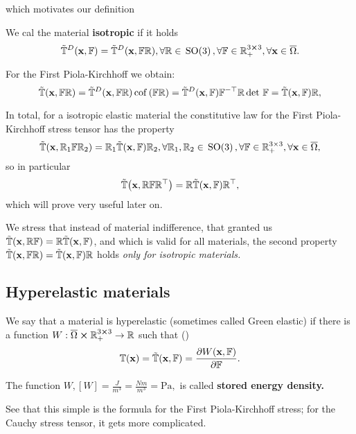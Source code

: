 \documentclass[11pt]{scrartcl} %
\begin{document}
which motivates our definition

\begin{definition}
	We cal the material \textbf{isotropic} if it holds
	\[
		\tilde{\mathbb{T}}^D\qty(\vb{x},\mathbb{F}) = \tilde{\mathbb{T}}^D\qty(\vb{x},\mathbb{F} \mathbb{R}), \forall \mathbb{R} \in \, \text{SO(3)} \,, \forall \mathbb{F} \in {\mathbb R}^{3 \cross 3}_+, \forall \vb{x} \in \overline{\Omega}.
	\]
\end{definition}
\begin{remark}
	For the First Piola-Kirchhoff we obtain:
	\[
		\tilde{\mathbb{T}}\qty(\vb{x}, \mathbb{F} \mathbb{R}) = \tilde{\mathbb{T}}^D\qty(\vb{x}, \mathbb{F} \mathbb{R})\operatorname{cof}\qty(\mathbb{F} \mathbb{R}) = \tilde{\mathbb{T}}^D\qty(\vb{x}, \mathbb{F}) \mathbb{F}^{-\top} \mathbb{R} \det\, \mathbb{F} = \tilde{\mathbb{T}}\qty(\vb{x}, \mathbb{F})\mathbb{R},
	\]
\end{remark}

In total, for a isotropic elastic material the constitutive law for the First Piola-Kirchhoff stress tensor has the property
\[
	\tilde{\mathbb{T}}\qty(\vb{x}, \mathbb{R}_1 \mathbb{F} \mathbb{R}_2) = \mathbb{R}_1 \tilde{\mathbb{T}}\qty(\vb{x}, \mathbb{F}) \mathbb{R}_2, \forall \mathbb{R}_1, \mathbb{R}_2 \in \, \text{SO(3)} \,, \forall \mathbb{F} \in {\mathbb R}^{3 \times 3}_+, \forall \vb{x} \in \overline{\Omega},
\]
so in particular
\[
	\tilde{\mathbb{T}}\qty(\vb{x}, \mathbb{R} \mathbb{F} \mathbb{R}^\top) = \mathbb{R} \tilde{\mathbb{T}}\qty(\vb{x}, \mathbb{F}) \mathbb{R}^\top,
\]
which will prove very useful later on.

\begin{remark}
    We stress that instead of material indifference, that granted us $\tilde{\mathbb{T}}\qty(\vb{x}, \mathbb{R} \mathbb{F}) = \mathbb{R} \tilde{\mathbb{T}}\qty(\vb{x}, \mathbb{F})$, and which is valid for all materials, the second property $\tilde{\mathbb{T}}\qty(\vb{x}, \mathbb{F} \mathbb{R}) = \tilde{\mathbb{T}}\qty(\vb{x}, \mathbb{F}) \mathbb{R}$ holds \textit{only for isotropic materials.}
\end{remark}

\subsection{Hyperelastic materials}
\label{sec:hyperelasticity}
\begin{definition}
	We say that a material is hyperelastic (sometimes called Green elastic) if there is a function $W:\overline{\Omega} \cross {\mathbb R}^{3 \cross 3}_+ \to {\mathbb R}$ such that (\cite{kruzikElasticMaterials2019})
	\[
		\mathbb{T}\qty(\vb{x}) = \tilde{\mathbb{T}}\qty(\vb{x}, \mathbb{F}) = \pdv{W\qty(\vb{x},\ensuremath{\mathbb{F}})}{\ensuremath{\mathbb{F}}}.
	\]

The function $W, [W] = \frac{J}{m^3} = \frac{N m}{m^3} = \text{Pa},$ is called \textbf{stored energy density.}
\begin{remark}
    See that this simple is the formula for the First Piola-Kirchhoff stress; for the Cauchy stress tensor, it gets more complicated.
\end{remark}
\end{definition}
\end{document}
